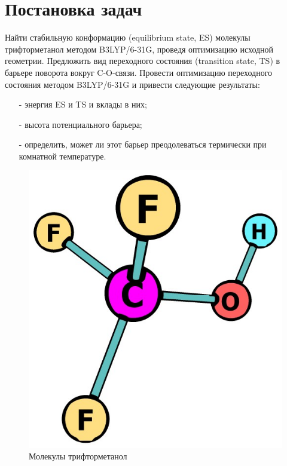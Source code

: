\section{Постановка задач}
Найти стабильную конформацию (equilibrium state, ES) молекулы трифторметанол методом B3LYP/6-31G, проведя оптимизацию исходной геометрии. Предложить вид переходного состояния (transition state, TS) в барьере поворота вокруг C-O-связи. Провести оптимизацию переходного состояния методом B3LYP/6-31G и привести следующие результаты:
\begin{itemize}
    \item[-] энергия ES и TS и вклады в них;
    \item[-] высота потенциального барьера;
    \item[-] определить, может ли этот барьер преодолеваться термически при комнатной температуре.
\end{itemize}

\begin{figure}[H]
\centering
\captionsetup{justification=centering}
\includegraphics[scale=0.4]{fig/0.jpg}
\caption{Молекулы трифторметанол}
\end{figure}